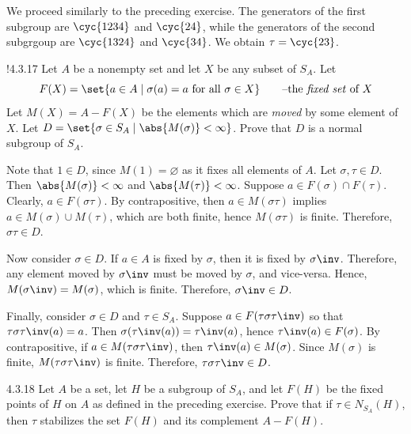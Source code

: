 \begin{sol}
	We proceed similarly to the preceding exercise.
	The generators of the first subgroup are $\cyc{1 2 3 4}$ and $\cyc{2 4}$, while the generators of the second subgrgoup are $\cyc{1 3 2 4}$ and $\cyc{3 4}$.
	We obtain $\tau = \cyc{2 3}$.
\end{sol}

\begin{exercise}!{4.3.17}
	Let $A$ be a nonempty set and let $X$ be any subset of $S_A$.
	Let
	\[
		F(X) = \set{a \in A \mid \sigma(a) = a \text{ for all } \sigma \in X} \qquad \text{--the \emph{fixed set} of $X$}
	\]
	Let $M(X) = A - F(X)$ be the elements which are \emph{moved} by some element of $X$.
	Let $D = \set{\sigma \in S_A \mid \abs{M(\sigma)} < \infty}$.
	Prove that $D$ is a normal subgroup of $S_A$.
\end{exercise}

\begin{sol}
	Note that $1 \in D$, since $M(1) = \varnothing$ as it fixes all elements of $A$.
	Let $\sigma, \tau \in D$.
	Then $\abs{M(\sigma)} < \infty$ and $\abs{M(\tau)} < \infty$.
	Suppose $a \in F(\sigma) \cap F(\tau)$.
	Clearly, $a \in F(\sigma\tau)$.
	By contrapositive, then $a \in M(\sigma\tau)$ implies $a \in M(\sigma) \cup M(\tau)$, which are both finite, hence $M(\sigma\tau)$ is finite.
	Therefore, $\sigma\tau \in D$.
	
	Now consider $\sigma \in D$.
	If $a \in A$ is fixed by $\sigma$, then it is fixed by $\sigma\inv$.
	Therefore, any element moved by $\sigma\inv$ must be moved by $\sigma$, and vice-versa.
	Hence, $M(\sigma\inv) = M(\sigma)$, which is finite.
	Therefore, $\sigma\inv \in D$.

	Finally, consider $\sigma \in D$ and $\tau \in S_A$.
	Suppose $a \in F(\tau\sigma\tau\inv)$ so that $\tau\sigma\tau\inv(a) = a$.
	Then $\sigma(\tau\inv(a)) = \tau\inv(a)$, hence $\tau\inv(a) \in F(\sigma)$.
	By contrapositive, if $a \in M(\tau\sigma\tau\inv)$, then $\tau\inv(a) \in M(\sigma)$.
	Since $M(\sigma)$ is finite, $M(\tau\sigma\tau\inv)$ is finite.
	Therefore, $\tau\sigma\tau\inv \in D$.
\end{sol}

\begin{exercise}{4.3.18}
	Let $A$ be a set, let $H$ be a subgroup of $S_A$, and let $F(H)$ be the fixed points of $H$ on $A$ as defined in the preceding exercise.
	Prove that if $\tau \in N_{S_A}(H)$, then $\tau$ stabilizes the set $F(H)$ and its complement $A - F(H)$.
\end{exercise}

